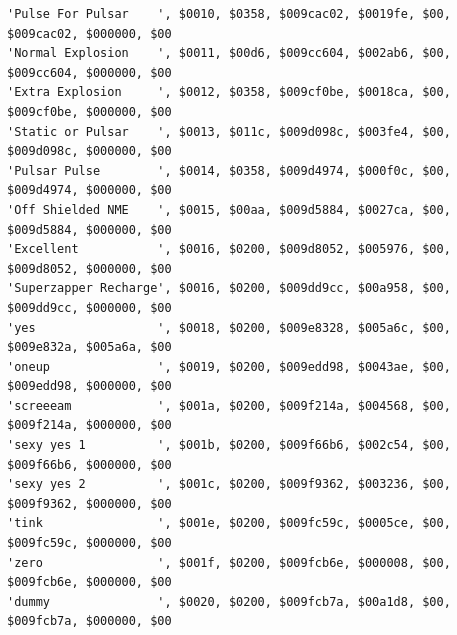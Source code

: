 \begin{lstlisting}[basicstyle=\scriptsize\ttfamily]
'Pulse For Pulsar    ', $0010, $0358, $009cac02, $0019fe, $00, $009cac02, $000000, $00
'Normal Explosion    ', $0011, $00d6, $009cc604, $002ab6, $00, $009cc604, $000000, $00
'Extra Explosion     ', $0012, $0358, $009cf0be, $0018ca, $00, $009cf0be, $000000, $00
'Static or Pulsar    ', $0013, $011c, $009d098c, $003fe4, $00, $009d098c, $000000, $00
'Pulsar Pulse        ', $0014, $0358, $009d4974, $000f0c, $00, $009d4974, $000000, $00
'Off Shielded NME    ', $0015, $00aa, $009d5884, $0027ca, $00, $009d5884, $000000, $00
'Excellent           ', $0016, $0200, $009d8052, $005976, $00, $009d8052, $000000, $00
'Superzapper Recharge', $0016, $0200, $009dd9cc, $00a958, $00, $009dd9cc, $000000, $00
'yes                 ', $0018, $0200, $009e8328, $005a6c, $00, $009e832a, $005a6a, $00
'oneup               ', $0019, $0200, $009edd98, $0043ae, $00, $009edd98, $000000, $00
'screeeam            ', $001a, $0200, $009f214a, $004568, $00, $009f214a, $000000, $00
'sexy yes 1          ', $001b, $0200, $009f66b6, $002c54, $00, $009f66b6, $000000, $00
'sexy yes 2          ', $001c, $0200, $009f9362, $003236, $00, $009f9362, $000000, $00
'tink                ', $001e, $0200, $009fc59c, $0005ce, $00, $009fc59c, $000000, $00
'zero                ', $001f, $0200, $009fcb6e, $000008, $00, $009fcb6e, $000000, $00
'dummy               ', $0020, $0200, $009fcb7a, $00a1d8, $00, $009fcb7a, $000000, $00
\end{lstlisting}

